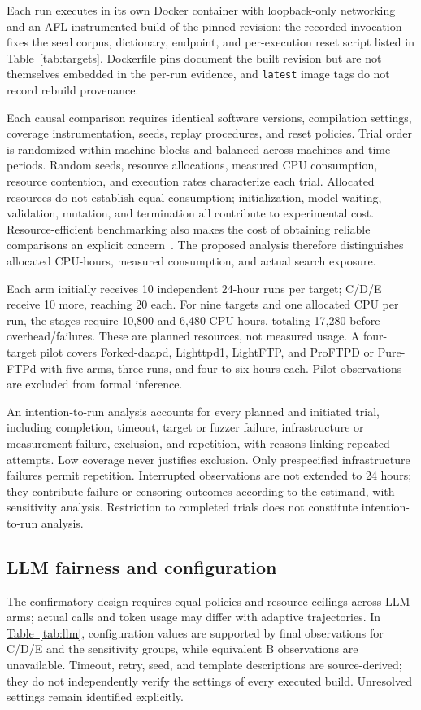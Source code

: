 \documentclass[final,5p,times,number]{elsarticle}
\newcommand{\namedref}[2]{\hyperref[#2]{#1~\ref*{#2}}}
\begin{document}
Each run executes in its own Docker container with loopback-only networking and an AFL-instrumented build of the pinned revision; the recorded invocation fixes the seed corpus, dictionary, endpoint, and per-execution reset script listed in \namedref{Table}{tab:targets}. Dockerfile pins document the built revision but are not themselves embedded in the per-run evidence, and \texttt{latest} image tags do not record rebuild provenance.

Each causal comparison requires identical software versions, compilation settings, coverage instrumentation, seeds, replay procedures, and reset policies. Trial order is randomized within machine blocks and balanced across machines and time periods. Random seeds, resource allocations, measured CPU consumption, resource contention, and execution rates characterize each trial. Allocated resources do not establish equal consumption; initialization, model waiting, validation, mutation, and termination all contribute to experimental cost. Resource-efficient benchmarking also makes the cost of obtaining reliable comparisons an explicit concern~\cite{greenbenchmark2023}. The proposed analysis therefore distinguishes allocated CPU-hours, measured consumption, and actual search exposure.

Each arm initially receives 10 independent 24-hour runs per target; C/D/E receive 10 more, reaching 20 each. For nine targets and one allocated CPU per run, the stages require 10,800 and 6,480 CPU-hours, totaling 17,280 before overhead/failures. These are planned resources, not measured usage. A four-target pilot covers Forked-daapd, Lighttpd1, LightFTP, and ProFTPD or Pure-FTPd with five arms, three runs, and four to six hours each. Pilot observations are excluded from formal inference.

An intention-to-run analysis accounts for every planned and initiated trial, including completion, timeout, target or fuzzer failure, infrastructure or measurement failure, exclusion, and repetition, with reasons linking repeated attempts. Low coverage never justifies exclusion. Only prespecified infrastructure failures permit repetition. Interrupted observations are not extended to 24 hours; they contribute failure or censoring outcomes according to the estimand, with sensitivity analysis. Restriction to completed trials does not constitute intention-to-run analysis.

\subsection{LLM fairness and configuration}
The confirmatory design requires equal policies and resource ceilings across LLM arms; actual calls and token usage may differ with adaptive trajectories. In \namedref{Table}{tab:llm}, configuration values are supported by final observations for C/D/E and the sensitivity groups, while equivalent B observations are unavailable. Timeout, retry, seed, and template descriptions are source-derived; they do not independently verify the settings of every executed build. Unresolved settings remain identified explicitly.
\end{document}
